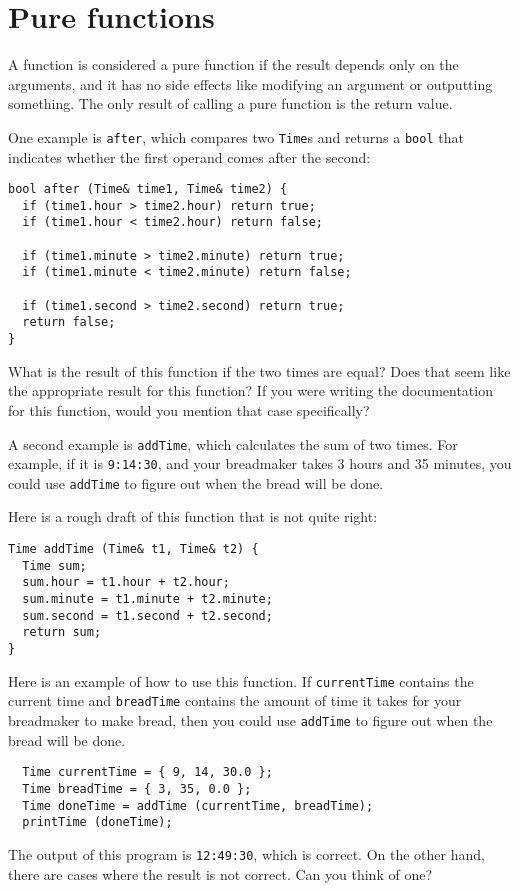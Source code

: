 \section{Pure functions}

A function is considered a pure function if the result depends only on
the arguments, and it has no side effects like modifying an argument
or outputting something.  The only result of calling a pure function is
the return value.

One example is {\tt after}, which compares two {\tt Time}s and
returns a {\tt bool} that indicates whether the first operand
comes after the second:

\begin{verbatim}
bool after (Time& time1, Time& time2) {
  if (time1.hour > time2.hour) return true;
  if (time1.hour < time2.hour) return false;

  if (time1.minute > time2.minute) return true;
  if (time1.minute < time2.minute) return false;

  if (time1.second > time2.second) return true;
  return false;
}
\end{verbatim}
%
What is the result of this function if the two times are equal?  Does
that seem like the appropriate result for this function?  If you were
writing the documentation for this function, would you mention that case
specifically?

A second example is {\tt addTime}, which calculates the sum of two
times.  For example, if it is {\tt 9:14:30}, and your breadmaker takes
3 hours and 35 minutes, you could use {\tt addTime} to figure out when
the bread will be done.

Here is a rough draft of this function that is not quite right:

\begin{verbatim}
Time addTime (Time& t1, Time& t2) {
  Time sum;
  sum.hour = t1.hour + t2.hour;
  sum.minute = t1.minute + t2.minute;
  sum.second = t1.second + t2.second;
  return sum;
}
\end{verbatim}
%
Here is an example of how to use this function.  If {\tt currentTime}
contains the current time and {\tt breadTime} contains the amount
of time it takes for your breadmaker to make bread, then you
could use {\tt addTime} to figure out when the bread will be
done.

\begin{verbatim}
  Time currentTime = { 9, 14, 30.0 };
  Time breadTime = { 3, 35, 0.0 };
  Time doneTime = addTime (currentTime, breadTime);
  printTime (doneTime);
\end{verbatim}
%
The output of this program is {\tt 12:49:30}, which is
correct.  On the other hand, there are cases where the result
is not correct.  Can you think of one?

